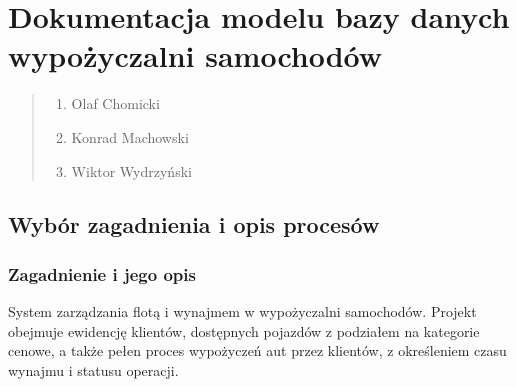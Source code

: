 \documentclass[a4paper,11pt,english,openany,oneside]{sphinxmanual}
\begin{document}
\chapter{Dokumentacja modelu bazy danych wypożyczalni samochodów}
\label{\detokenize{rozdzial_3/index:dokumentacja-modelu-bazy-danych-wypozyczalni-samochodow}}\label{\detokenize{rozdzial_3/index::doc}}\begin{quote}\begin{description}
\begin{enumerate}
%
\item {} 
\sphinxAtStartPar
Olaf Chomicki

\item {} 
\sphinxAtStartPar
Konrad Machowski

\item {} 
\sphinxAtStartPar
Wiktor Wydrzyński

\end{enumerate}

\end{description}\end{quote}


\section{Wybór zagadnienia i opis procesów}
\label{\detokenize{rozdzial_3/index:wybor-zagadnienia-i-opis-procesow}}

\subsection{Zagadnienie i jego opis}
\label{\detokenize{rozdzial_3/index:zagadnienie-i-jego-opis}}
\sphinxAtStartPar
System zarządzania flotą i wynajmem w wypożyczalni samochodów.
Projekt obejmuje ewidencję klientów, dostępnych pojazdów z podziałem na kategorie cenowe, a także pełen proces wypożyczeń aut przez klientów, z określeniem czasu wynajmu i statusu operacji.
\end{document}

